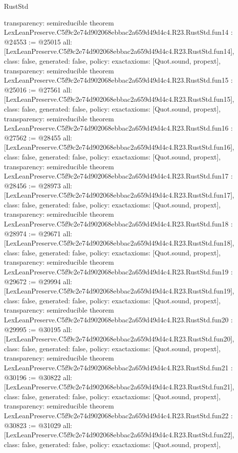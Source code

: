 \begin{lexlean}{RustStd}
\begin{coremodule}
{  transparency: semireducible
}
theorem LexLeanPreserve.C5f9c2e74d902068ebbac2a659d49d4c4.R23.RustStd.fun14 : @24553 := @25015 {
  all: [LexLeanPreserve.C5f9c2e74d902068ebbac2a659d49d4c4.R23.RustStd.fun14],
  class: false,
  generated: false,
  policy: exact{axioms: [Quot.sound, propext]},
  transparency: semireducible
}
theorem LexLeanPreserve.C5f9c2e74d902068ebbac2a659d49d4c4.R23.RustStd.fun15 : @25016 := @27561 {
  all: [LexLeanPreserve.C5f9c2e74d902068ebbac2a659d49d4c4.R23.RustStd.fun15],
  class: false,
  generated: false,
  policy: exact{axioms: [Quot.sound, propext]},
  transparency: semireducible
}
theorem LexLeanPreserve.C5f9c2e74d902068ebbac2a659d49d4c4.R23.RustStd.fun16 : @27562 := @28455 {
  all: [LexLeanPreserve.C5f9c2e74d902068ebbac2a659d49d4c4.R23.RustStd.fun16],
  class: false,
  generated: false,
  policy: exact{axioms: [Quot.sound, propext]},
  transparency: semireducible
}
theorem LexLeanPreserve.C5f9c2e74d902068ebbac2a659d49d4c4.R23.RustStd.fun17 : @28456 := @28973 {
  all: [LexLeanPreserve.C5f9c2e74d902068ebbac2a659d49d4c4.R23.RustStd.fun17],
  class: false,
  generated: false,
  policy: exact{axioms: [Quot.sound, propext]},
  transparency: semireducible
}
theorem LexLeanPreserve.C5f9c2e74d902068ebbac2a659d49d4c4.R23.RustStd.fun18 : @28974 := @29671 {
  all: [LexLeanPreserve.C5f9c2e74d902068ebbac2a659d49d4c4.R23.RustStd.fun18],
  class: false,
  generated: false,
  policy: exact{axioms: [Quot.sound, propext]},
  transparency: semireducible
}
theorem LexLeanPreserve.C5f9c2e74d902068ebbac2a659d49d4c4.R23.RustStd.fun19 : @29672 := @29994 {
  all: [LexLeanPreserve.C5f9c2e74d902068ebbac2a659d49d4c4.R23.RustStd.fun19],
  class: false,
  generated: false,
  policy: exact{axioms: [Quot.sound, propext]},
  transparency: semireducible
}
theorem LexLeanPreserve.C5f9c2e74d902068ebbac2a659d49d4c4.R23.RustStd.fun20 : @29995 := @30195 {
  all: [LexLeanPreserve.C5f9c2e74d902068ebbac2a659d49d4c4.R23.RustStd.fun20],
  class: false,
  generated: false,
  policy: exact{axioms: [Quot.sound, propext]},
  transparency: semireducible
}
theorem LexLeanPreserve.C5f9c2e74d902068ebbac2a659d49d4c4.R23.RustStd.fun21 : @30196 := @30822 {
  all: [LexLeanPreserve.C5f9c2e74d902068ebbac2a659d49d4c4.R23.RustStd.fun21],
  class: false,
  generated: false,
  policy: exact{axioms: [Quot.sound, propext]},
  transparency: semireducible
}
theorem LexLeanPreserve.C5f9c2e74d902068ebbac2a659d49d4c4.R23.RustStd.fun22 : @30823 := @31029 {
  all: [LexLeanPreserve.C5f9c2e74d902068ebbac2a659d49d4c4.R23.RustStd.fun22],
  class: false,
  generated: false,
  policy: exact{axioms: [Quot.sound, propext]},
}
\end{coremodule}
\end{lexlean}
